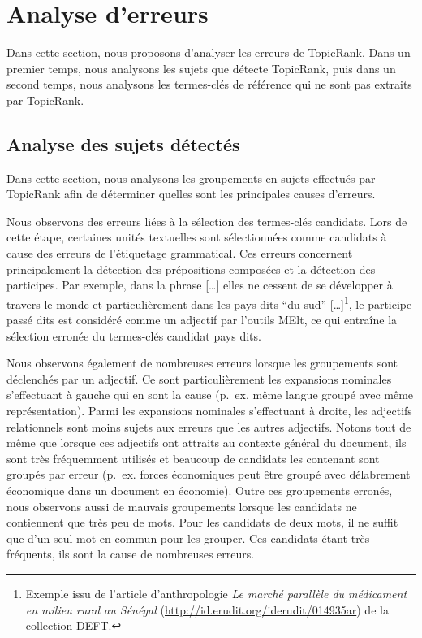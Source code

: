 \section{Analyse d'erreurs}
\label{sec:analyse_d_erreurs}
  Dans cette section, nous proposons d'analyser les erreurs de TopicRank. Dans
  un premier temps, nous analysons les sujets que détecte TopicRank, puis dans
  un second temps, nous analysons les termes-clés de référence qui ne sont pas
  extraits par TopicRank.

  \subsection{Analyse des sujets détectés}
  \label{subsec:analyse_des_sujets_générés}
    Dans cette section, nous analysons les groupements en sujets effectués par
    Topic\-Rank afin de déterminer quelles sont les principales causes
    d'erreurs.

    Nous observons des erreurs liées à la sélection des
    termes-clés candidats. Lors de cette étape, certaines unités textuelles sont
    sélectionnées comme candidats à cause des erreurs de l'étiquetage
    grammatical. Ces erreurs concernent principalement la détection des
    prépositions composées et la détection des participes. Par exemple, dans la
    phrase \og{}[\dots] elles ne cessent de se développer à travers le monde et
    particulièrement dans les pays dits ``du sud'' [\dots]\fg{}\footnote{Exemple
    issu de l'article d'anthropologie \textit{Le marché parallèle du médicament
    en milieu rural au Sénégal} (\url{http://id.erudit.org/iderudit/014935ar})
    de la collection DEFT.}, le participe passé \og{}dits\fg{} est considéré
    comme un adjectif par l'outils MElt, ce qui entraîne la sélection erronée du
    termes-clés candidat \og{}pays dits\fg{}.

    Nous observons également de nombreuses erreurs lorsque les
    groupements sont déclenchés par un adjectif. Ce sont particulièrement les
    expansions nominales s'effectuant à gauche qui en sont la cause (p.~ex.
    \og{}même langue\fg{} groupé avec \og{}même représentation\fg{}). Parmi les
    expansions nominales s'effectuant à droite, les adjectifs relationnels sont
    moins sujets aux erreurs que les autres adjectifs. Notons tout de même que
    lorsque ces adjectifs ont attraits au contexte général du document, ils sont
    très fréquemment utilisés et beaucoup de candidats les contenant sont
    groupés par erreur (p.~ex. \og{}forces économiques\fg{} peut être groupé 
    avec \og{}délabrement économique\fg{} dans un document en économie). Outre
    ces groupements erronés, nous observons aussi de mauvais groupements lorsque
    les candidats ne contiennent que très peu de mots. Pour les candidats de
    deux mots, il ne suffit que d'un seul mot en commun pour les grouper. Ces
    candidats étant très fréquents, ils sont la cause de nombreuses erreurs.

